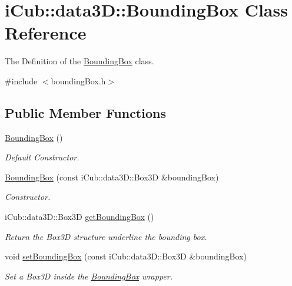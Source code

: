 \section{i\+Cub\+:\+:data3D\+:\+:Bounding\+Box Class Reference}
\label{classiCub_1_1data3D_1_1BoundingBox}


The Definition of the \hyperlink{classiCub_1_1data3D_1_1BoundingBox}{Bounding\+Box} class.  




{\ttfamily \#include $<$bounding\+Box.\+h$>$}

\subsection*{Public Member Functions}
\begin{DoxyCompactItemize}
\item 
\label{classiCub_1_1data3D_1_1BoundingBox_aed6d593bf4359e014acb416663e66903} 
\hyperlink{classiCub_1_1data3D_1_1BoundingBox_aed6d593bf4359e014acb416663e66903}{Bounding\+Box} ()
\begin{DoxyCompactList}\small\item\em Default Constructor. \end{DoxyCompactList}\item 
\hyperlink{classiCub_1_1data3D_1_1BoundingBox_a5c2f97ac3178b7b04610428d4cf14a3d}{Bounding\+Box} (const i\+Cub\+::data3\+D\+::\+Box3D \&bounding\+Box)
\begin{DoxyCompactList}\small\item\em Constructor. \end{DoxyCompactList}\item 
i\+Cub\+::data3\+D\+::\+Box3D \hyperlink{classiCub_1_1data3D_1_1BoundingBox_a4930ffe6b57fc6823adb80b2f4143619}{get\+Bounding\+Box} ()
\begin{DoxyCompactList}\small\item\em Return the Box3D structure underline the bounding box. \end{DoxyCompactList}\item 
void \hyperlink{classiCub_1_1data3D_1_1BoundingBox_ab9c2a8dfb61a2c0c02529968df5a2e2e}{set\+Bounding\+Box} (const i\+Cub\+::data3\+D\+::\+Box3D \&bounding\+Box)
\begin{DoxyCompactList}\small\item\em Set a Box3D inside the \hyperlink{classiCub_1_1data3D_1_1BoundingBox}{Bounding\+Box} wrapper. \end{DoxyCompactList}\item 

\end{DoxyCompactItemize}
